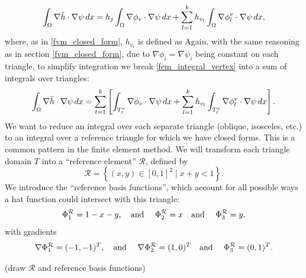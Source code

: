 \begin{equation}\label{fem_integral_vertex}
    \int_{{\Omega}} \nabla \tilde{h}\cdot \nabla \psi\,dx
     = h_j\int_{{\Omega}}\nabla\phi_v\cdot\nabla\psi\,dx + \sum_{l=1}^{k}h_{v_l}\int_{{\Omega}}\nabla\phi^v_l\cdot\nabla\psi\,dx,
\end{equation}
where, as in \ref{fvm_closed_form}, $h_{v_i}$ is defined as
\hvidefinition
Again, with the same reasoning as in section \ref{fvm_closed_form}, due to $\nabla\phi_i = \nabla\psi_i$ being constant on each triangle, to simplify integration
we break \eqref{fem_integral_vertex} into a sum of integrals over triangles:
\begin{equation}\label{fem_integral_vertex_triangles}
    \int_{{\Omega}} \nabla \tilde{h}\cdot \nabla \psi\,dx
    = \sum_{t=1}^k\left[\int_{T^v_t}\nabla\phi_v\cdot\nabla\psi\,dx + \sum_{l=1}^{k}h_{v_l}\int_{T^v_t}\nabla\phi^v_l\cdot\nabla\psi\,dx\right].
\end{equation}
We want to reduce an integral over each separate triangle (oblique, isosceles, etc.) to an integral over a reference triangle
for which we have closed forms.
This is a common pattern in the finite element method.
We will transform each triangle domain $T$ into a ``reference element''
\newcommand{\reftri}{{\mathcal{R}}}
$\reftri$, defined by
    $$\reftri = \left\{(x,y) \in [0,1]^2 \mid x + y < 1\right\}.$$
We introduce the ``reference basis functions'', which account for all possible ways a hat function could intersect with this triangle:
\begin{equation}\label{fem_reference_basis_functions}
    \Phi^\reftri_1 = 1-x-y, \text{\quad and \quad} \Phi^\reftri_2 = x \text{\quad and \quad} \Phi^\reftri_3 = y.
\end{equation}
with gradients
\begin{equation}\label{fem_reference_basis_function_gradients}
    \nabla\Phi^\reftri_1 = (-1, -1)^T, \text{\quad and \quad} \nabla\Phi^\reftri_2 = (1,0)^T \text{\quad and \quad} \Phi^\reftri_3 = (0,1)^T.
\end{equation}

\vskip 0.2in
(draw $\reftri$ and reference basis functions)
\vskip 0.2in

